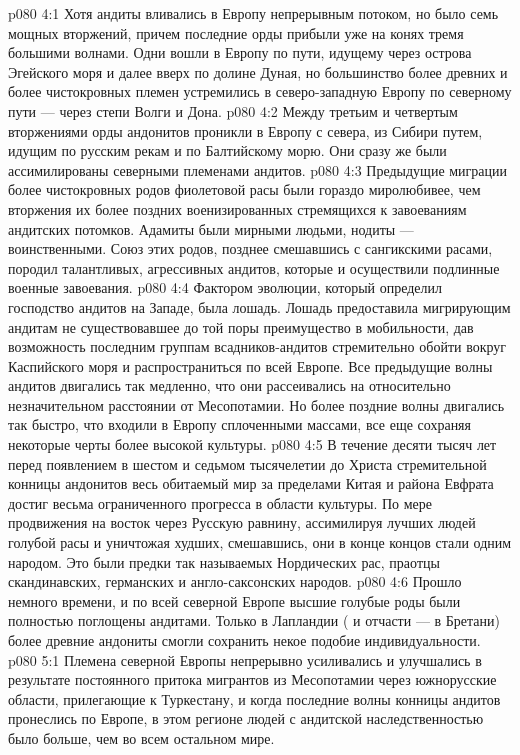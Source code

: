\vs p080 4:1 Хотя андиты вливались в Европу непрерывным потоком, но было семь мощных вторжений, причем последние орды прибыли уже на конях тремя большими волнами. Одни вошли в Европу по пути, идущему через острова Эгейского моря и далее вверх по долине Дуная, но большинство более древних и более чистокровных племен устремились в северо\hyp{}западную Европу по северному пути --- через степи Волги и Дона.
\vs p080 4:2 Между третьим и четвертым вторжениями орды андонитов проникли в Европу с севера, из Сибири путем, идущим по русским рекам и по Балтийскому морю. Они сразу же были ассимилированы северными племенами андитов.
\vs p080 4:3 Предыдущие миграции более чистокровных родов фиолетовой расы были гораздо миролюбивее, чем вторжения их более поздних военизированных стремящихся к завоеваниям андитских потомков. Адамиты были мирными людьми, нодиты --- воинственными. Союз этих родов, позднее смешавшись с сангикскими расами, породил талантливых, агрессивных андитов, которые и осуществили подлинные военные завоевания.
\vs p080 4:4 \pc Фактором эволюции, который определил господство андитов на Западе, была лошадь. Лошадь предоставила мигрирующим андитам не существовавшее до той поры преимущество в мобильности, дав возможность последним группам всадников\hyp{}андитов стремительно обойти вокруг Каспийского моря и распространиться по всей Европе. Все предыдущие волны андитов двигались так медленно, что они рассеивались на относительно незначительном расстоянии от Месопотамии. Но более поздние волны двигались так быстро, что входили в Европу сплоченными массами, все еще сохраняя некоторые черты более высокой культуры.
\vs p080 4:5 В течение десяти тысяч лет перед появлением в шестом и седьмом тысячелетии до Христа стремительной конницы андонитов весь обитаемый мир за пределами Китая и района Евфрата достиг весьма ограниченного прогресса в области культуры. По мере продвижения на восток через Русскую равнину, ассимилируя лучших людей голубой расы и уничтожая худших, смешавшись, они в конце концов стали одним народом. Это были предки так называемых Нордических рас, праотцы скандинавских, германских и англо\hyp{}саксонских народов.
\vs p080 4:6 \pc Прошло немного времени, и по всей северной Европе высшие голубые роды были полностью поглощены андитами. Только в Лапландии ( и отчасти --- в Бретани) более древние андониты смогли сохранить некое подобие индивидуальности.
\vs p080 5:1 Племена северной Европы непрерывно усиливались и улучшались в результате постоянного притока мигрантов из Месопотамии через южнорусские области, прилегающие к Туркестану, и когда последние волны конницы андитов пронеслись по Европе, в этом регионе людей с андитской наследственностью было больше, чем во всем остальном мире.
